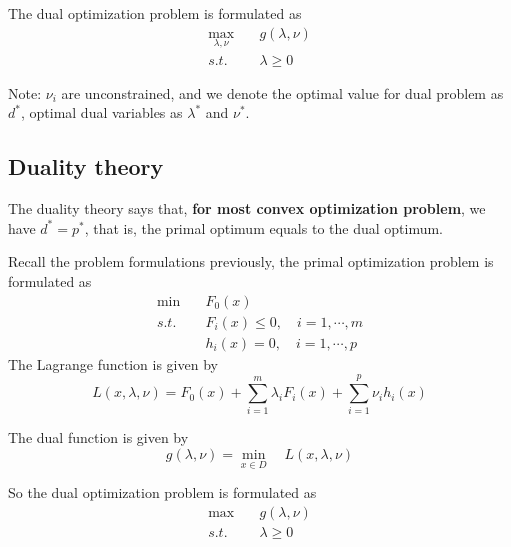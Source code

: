 \begin{definition} The dual optimization problem is formulated as
	\begin{align*}
		\max_{\lambda, \nu} \quad&g(\lambda, \nu) \\
		s.t. \quad&\lambda \geq 0
	\end{align*}
	
	Note: $\nu_i$ are unconstrained, and we denote the optimal value for dual problem as $d^*$, optimal dual variables as $\lambda^*$ and $\nu^*$.
\end{definition}


\subsection{Duality theory}
The duality theory says that, \textbf{for most convex optimization problem}, we have $d^* = p^*$, that is, the primal optimum equals to the dual optimum.

Recall the problem formulations previously, the primal optimization problem is formulated as 
\begin{align*}
	\min \quad&F_0(x) \\
	s.t. \quad&F_i(x)\leq 0, \quad i = 1,\cdots,m \\
	&h_i(x)= 0, \quad i = 1,\cdots,p
\end{align*}
The Lagrange function is given by 
\begin{equation*}
	L(x,\lambda,\nu) = F_0(x) + \sum^m_{i=1}\lambda_i F_i(x) + \sum^p_{i=1}\nu_i h_i(x)
\end{equation*}

The dual function is given by
\begin{equation*}
	g(\lambda, \nu) = \min_{x\in D}\quad L(x,\lambda,\nu) 
\end{equation*}

So the dual optimization problem is formulated as 
\begin{align*}
	\max \quad&g(\lambda, \nu) \\
	s.t. \quad&\lambda \geq 0
\end{align*}



